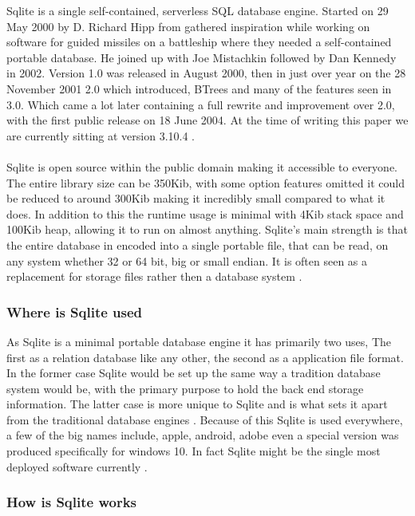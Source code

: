 Sqlite is a single self-contained, serverless SQL database engine. Started on 29 May 2000 by D. Richard Hipp \citep{sqlite} from gathered inspiration while working on software for guided missiles on a battleship where they needed a self-contained portable database. \citep{sqlitedefguide} He joined up with Joe Mistachkin followed by Dan Kennedy in 2002. Version 1.0 was released in August 2000, then in just over year on the 28 November 2001 2.0 which introduced, BTrees and many of the features seen in 3.0. Which came a lot later containing a full rewrite and improvement over 2.0, with the first public release on 18 June 2004. At the time of writing this paper we are currently sitting at version 3.10.4 \citep{sqlite}.
\\\\
Sqlite is open source within the public domain making it accessible to everyone. The entire library size can be 350Kib, with some option features omitted it could be reduced to around 300Kib making it incredibly small compared to what it does. In addition to this the runtime usage is minimal with 4Kib stack space and 100Kib heap, allowing it to run on almost anything. Sqlite's main strength is that the entire database in encoded into a single portable file, that can be read, on any system whether 32 or 64 bit, big or small endian. It is often seen as a replacement for storage files rather then a database system \citep{sqlite}.

\subsubsection{Where is Sqlite used}
\label{subsubsec:where_is_sqlite}

As Sqlite is a minimal portable database engine it has primarily two uses, The first as a relation database like any other, the second as a application file format. In the former case Sqlite would be set up the same way a tradition database system would be, with the primary purpose to hold the back end storage information. The latter case is more unique to Sqlite and is what sets it apart from the traditional database engines \citep{sqlite}. Because of this Sqlite is used everywhere, a few of the big names include, apple, android, adobe even a special version was produced specifically for windows 10. In fact Sqlite might be the single most deployed software currently \citep{sqlite, sqlitetalk}.

\subsubsection{How is Sqlite works}
\label{subsubsec:how_sqlite_works}


